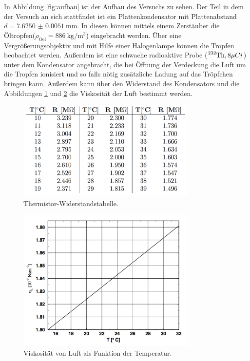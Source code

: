 In Abbildung \ref{fig:aufbau} ist der Aufbau des Versuchs zu sehen.
Der Teil in dem der Versuch an sich stattfindet ist ein Plattenkondensator mit
Plattenabstand $ d = \SI{7.6250(51)}{\milli\meter}$. In diesen können
mittels einem Zerstäuber die Öltropfen($\rho_\text{Oel} = \SI{886}{\kilogram\per\cubic\metre}$) eingebracht werden. Über eine Vergrößerungsobjektiv
und mit Hilfe einer Halogenlampe können die Tropfen beobachtet werden.
Außerdem ist eine schwache radioaktive Probe ($\ce{^{232}Th}, 8 \mu Ci$) unter dem Kondensator angebracht,
die bei Öffnung der Verdeckung die Luft um die Tropfen ionisiert und so falls nötig zusätzliche Ladung auf das
Tröpfchen bringen kann.
Außerdem kann über den Widerstand des Kondensators und die Abbildungen
\ref{fig:thermistor} und \ref{fig:luftviskositaet} die Viskosität der Luft bestimmt werden.
\begin{figure}
  \centering
  \includegraphics[width = 0.8\textwidth]{PicturePerfect/thermistor.pdf}
  \caption{Thermistor-Widerstandstabelle.\cite{anleitung}}
  \label{fig:thermistor}
\end{figure}
\begin{figure}
  \centering
  \includegraphics[width = 0.8\textwidth]{PicturePerfect/luftviskositaet.pdf}
  \caption{Viskosität von Luft als Funktion der Temperatur.\cite{anleitung}}
  \label{fig:luftviskositaet}
\end{figure}

